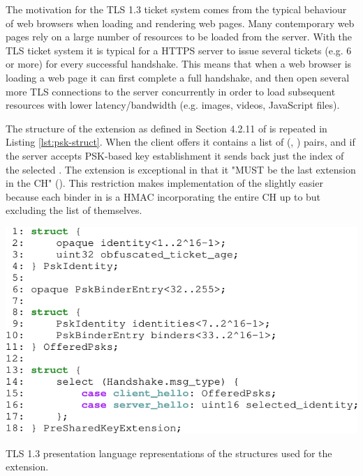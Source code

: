The motivation for the \ac{TLS} 1.3 ticket system
comes from the typical behaviour of web browsers when loading and rendering web pages.
Many contemporary web pages rely on a large number of resources to be loaded from the server.
With the \ac{TLS} ticket system it is typical for a \ac{HTTPS} server
to issue several tickets (e.g. 6 or more) for every successful handshake.
This means that when a web browser is loading a web page it can first complete a full handshake,
and then open several more TLS connections to the server concurrently
in order to load subsequent resources with lower latency/bandwidth (e.g. images, videos, JavaScript files).


The structure of the  extension as defined in Section 4.2.11 of \cite{esni} is repeated in Listing \ref{lst:psk-struct}.
When the client offers  it contains a list of (, ) pairs,
and if the server accepts \ac{PSK}-based key establishment it sends back just the index of the selected .
The  extension is exceptional in that it
"MUST be the last extension in the \ac{CH}" (\citet[Section 4.2]{esni}).
This restriction makes implementation of the  slightly easier because each binder in  is a \ac{HMAC} incorporating the entire \ac{CH} up to but excluding the list of  themselves.


\begin{listing}
    \centering
    \includegraphics[width=.8\linewidth]{figure/pre_shared_key.pdf}
    \captionsetup{width=.8\linewidth} 
    \caption[Structures for the  extension]{TLS 1.3 presentation language representations of the structures used for the  extension.}
    \label{lst:psk-struct}
\end{listing}

